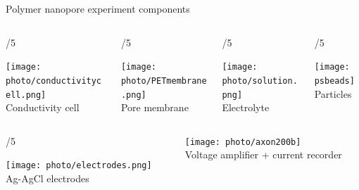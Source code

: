 

\begin{frame}[c]{Polymer nanopore experiment components}



	\begin{columns}[t]
		\begin{column}[T]{\paperwidth/5}
			{\centering
				\texttt{[image: photo/conductivitycell.png]} \\
				{\footnotesize Conductivity cell}
				\par
			}
		\end{column}
		
		
		\begin{column}[T]{\paperwidth/5}
			{\centering
				\texttt{[image: photo/PETmembrane.png]} \\
				{\footnotesize Pore membrane}
				\par
			}
		\end{column}
		
		
		
		\begin{column}[T]{\paperwidth/5}
			{\centering
				\texttt{[image: photo/solution.png]} \\
				{\footnotesize Electrolyte}
				\par
			}
		\end{column}

		
		

		
		\begin{column}[T]{\paperwidth/5}
			{\centering
				\texttt{[image: psbeads]} \\
				{\footnotesize Particles}
				\par
			}
		\end{column}

	\end{columns}
	
	\vspace{1cm}
	
	\begin{columns}[t]
		\begin{column}[T]{\paperwidth/5}
			{\centering
				\texttt{[image: photo/electrodes.png]} \\
				{\footnotesize Ag-AgCl electrodes}
				\par
			}
		\end{column}
		
		
		\begin{column}[T]{.6\paperwidth}
			{\centering
				\texttt{[image: photo/axon200b]} \\
				Voltage amplifier + current recorder
				\par
			}
		\end{column}
	

	\end{columns}


\end{frame}



